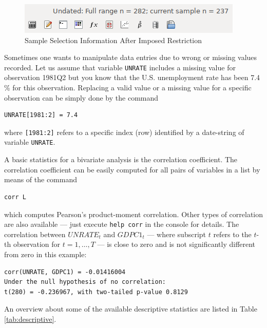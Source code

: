 \documentclass[11pt]{article}
\begin{document}
\begin{figure}[!h]
	\centering
	\includegraphics[width=.42\textwidth]{../figures/smpl_restrict}
	\caption{Sample Selection Information After Imposed Restriction}
	\label{fig:smpl}
\end{figure}

Sometimes one wants to manipulate data entries due to wrong or missing values recorded. Let us assume that variable \texttt{UNRATE} includes a missing value for observation 1981Q2 but you know that the U.S. unemployment rate has been 7.4 \% for this observation. Replacing a valid value or a missing value for a specific observation can be simply done by the command
\begin{Verbatim}[baselinestretch=0.75, fontsize=\small]
UNRATE[1981:2] = 7.4
\end{Verbatim}
where \texttt{[1981:2]} refers to a specific index (row) identified by a date-string of variable \texttt{UNRATE}.

A basic statistics for a bivariate analysis is the correlation coefficient. The correlation coefficient can be easily computed for all pairs of variables in a list by means of the command
\begin{Verbatim}[baselinestretch=0.75, fontsize=\small]
corr L
\end{Verbatim}
which computes Pearson's product-moment correlation. Other types of correlation %
are also available --- just execute \texttt{help corr} in the console for details. The correlation between $UNRATE_t$ and $GDPC1_t$ --- where subscript $ t $ refers to the $ t $-th observation for $ t=1,\ldots, T $ --- is close to zero and is not significantly different from zero in this example:
\begin{Verbatim}[baselinestretch=0.75, fontsize=\small]
corr(UNRATE, GDPC1) = -0.01416004
Under the null hypothesis of no correlation:
t(280) = -0.236967, with two-tailed p-value 0.8129
\end{Verbatim}

An overview about some of the available descriptive statistics are listed in Table \ref{tab:descriptive}.
\end{document}
